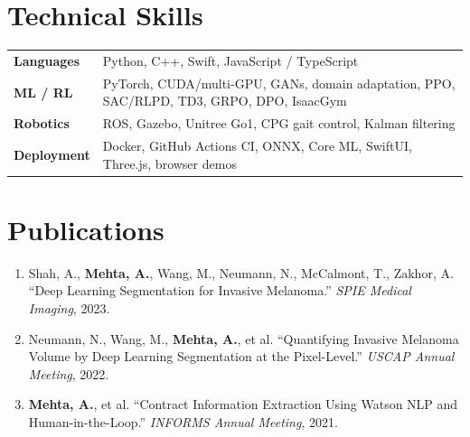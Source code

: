 \documentclass[10pt]{article}
\begin{document}
\section*{Technical Skills}
\begin{tabular}{@{}p{0.9in}l}
\textbf{Languages} & Python, C++, Swift, JavaScript / TypeScript \\
\textbf{ML / RL} & PyTorch, CUDA/multi-GPU, GANs, domain adaptation, PPO, SAC/RLPD, TD3, GRPO, DPO, IsaacGym \\
\textbf{Robotics} & ROS, Gazebo, Unitree Go1, CPG gait control, Kalman filtering \\
\textbf{Deployment} & Docker, GitHub Actions CI, ONNX, Core ML, SwiftUI, Three.js, browser demos \\
\end{tabular}

\section*{Publications}
\begin{enumerate}[leftmargin=1.4em,itemsep=1pt,topsep=1pt]
\item Shah, A., \textbf{Mehta, A.}, Wang, M., Neumann, N., McCalmont, T., Zakhor, A. ``Deep Learning Segmentation for Invasive Melanoma.'' \textit{SPIE Medical Imaging}, 2023.
\item Neumann, N., Wang, M., \textbf{Mehta, A.}, et al. ``Quantifying Invasive Melanoma Volume by Deep Learning Segmentation at the Pixel-Level.'' \textit{USCAP Annual Meeting}, 2022.
\item \textbf{Mehta, A.}, et al. ``Contract Information Extraction Using Watson NLP and Human-in-the-Loop.'' \textit{INFORMS Annual Meeting}, 2021.
\end{enumerate}
\end{document}
